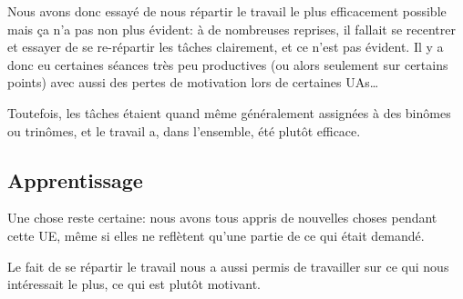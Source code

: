 Nous avons donc essayé de nous répartir le travail le plus efficacement possible
mais ça n'a pas non plus évident: à de nombreuses reprises, il fallait se recentrer
et essayer de se re-répartir les tâches clairement, et ce n'est pas évident.
Il y a donc eu certaines séances très peu productives (ou alors seulement
sur certains points) avec aussi des pertes de motivation lors de certaines UAs\dots

Toutefois, les tâches étaient quand même généralement assignées à des binômes
ou trinômes, et le travail a, dans l'ensemble, été plutôt efficace.

\subsection{Apprentissage}
  Une chose reste certaine: nous avons tous appris de nouvelles choses pendant
  cette UE, même si elles ne reflètent qu'une partie de ce qui était demandé.

  Le fait de se répartir le travail nous a aussi permis de travailler sur ce
  qui nous intéressait le plus, ce qui est plutôt motivant.
